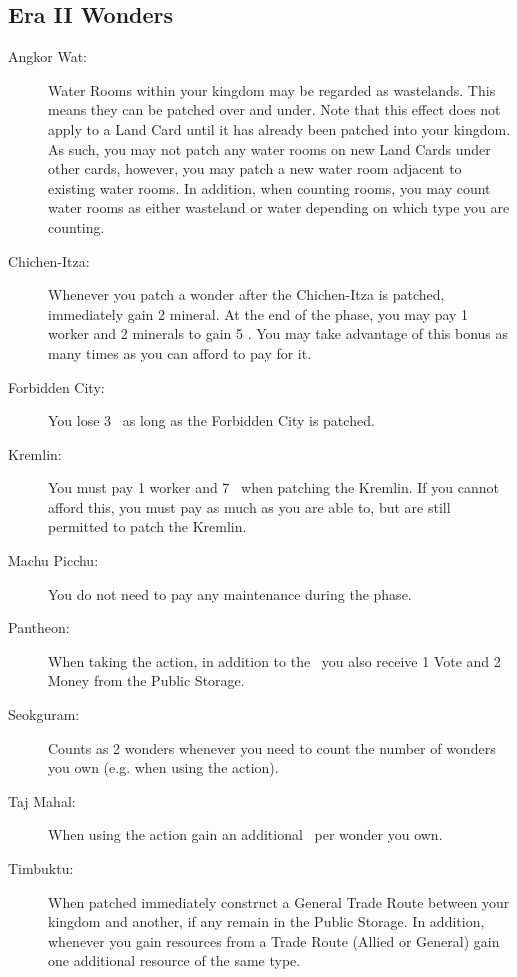 \documentclass[10pt,twocolumn]{article}
\begin{document}
\begin{appendices}
\subsection{Era II Wonders}
\begin{description}
\item[Angkor Wat:] Water Rooms within your kingdom may be regarded as wastelands. This means they can be patched over and under. Note that this effect does not apply to a Land Card until it has already been patched into your kingdom. As such, you may not patch any water rooms on new Land Cards under other cards, however, you may patch a new water room adjacent to existing water rooms. In addition, when counting rooms, you may count water rooms as either wasteland or water depending on which type you are counting.
\item[Chichen-Itza:] Whenever you patch a wonder after the Chichen-Itza is patched, immediately gain 2 mineral. At the end of the  phase, you may pay 1 worker and 2 minerals to gain 5 \vps. You may take advantage of this bonus as many times as you can afford to pay for it.
\item[Forbidden City:] You lose 3 \mil\ as long as the Forbidden City is patched.
\item[Kremlin:] You must pay 1 worker and 7 \vps\ when patching the Kremlin. If you cannot afford this, you must pay as much as you are able to, but are still permitted to patch the Kremlin.
\item[Machu Picchu:] You do not need to pay any maintenance during the  phase.
\item[Pantheon:] When taking the  action, in addition to the \vps\ you also receive 1 Vote and 2 Money from the Public Storage.
\item[Seokguram:] Counts as 2 wonders whenever you need to count the number of wonders you own (e.g. when using the  action).
\item[Taj Mahal:] When using the  action gain an additional \vp\ per wonder  you own.
\item[Timbuktu:] When patched immediately construct a General Trade Route between your kingdom and another, if any remain in the Public Storage. In addition, whenever you gain resources from a Trade Route (Allied or General) gain one additional resource of the same type.
\end{description}

\end{appendices}
\end{document}
